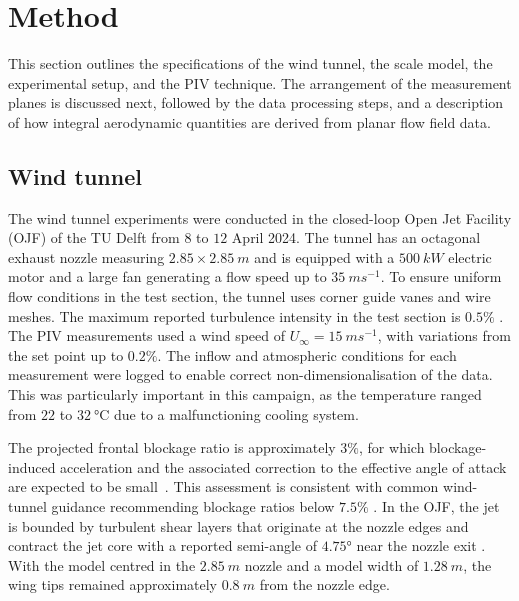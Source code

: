\documentclass[wes, manuscript]{copernicus}
\begin{document}
%
\section{Method}\label{sec:method}
%
This section outlines the specifications of the wind tunnel, the scale model, the experimental setup, and the PIV technique. The arrangement of the measurement planes is discussed next, followed by the data processing steps, and a description of how integral aerodynamic quantities are derived from planar flow field data.
%
\subsection{Wind tunnel}
%
The wind tunnel experiments were conducted in the closed-loop Open Jet Facility (OJF) of the TU Delft from $8$ to $12$ April 2024. The tunnel has an octagonal exhaust nozzle measuring $2.85 \times2.85~\unit{m}$ and is equipped with a $500~\unit{kW}$ electric motor and a large fan generating a flow speed up to $35~\unit{m s^{-1}}$. To ensure uniform flow conditions in the test section, the tunnel uses corner guide vanes and wire meshes. The maximum reported turbulence intensity in the test section is $0.5\%$ \citep{Lignarolo2014}. 
The PIV measurements used a wind speed of $U_\infty = 15~\unit{m s^{-1}}$, with variations from the set point up to $0.2\%$. The inflow and atmospheric conditions for each measurement were logged to enable correct non-dimensionalisation of the data. This was particularly important in this campaign, as the temperature ranged from $22$ to $32~\unit{\degree}\text{C}$ due to a malfunctioning cooling system. 

The projected frontal blockage ratio is approximately $3\%$, for which blockage-induced acceleration and the associated correction to the effective angle of attack are expected to be small~\citep{Poland2026a}. This assessment is consistent with common wind-tunnel guidance recommending blockage ratios below $7.5\%$ \citep{Barlow1999}. In the OJF, the jet is bounded by turbulent shear layers that originate at the nozzle edges and contract the jet core with a reported semi-angle of $4.75\unit{\degree}$ near the nozzle exit \citep{Lignarolo2014}. With the model centred in the $2.85~\unit{m}$ nozzle and a model width of $1.28~\unit{m}$, the wing tips remained approximately $0.8~\unit{m}$ from the nozzle edge. 
\end{document}
